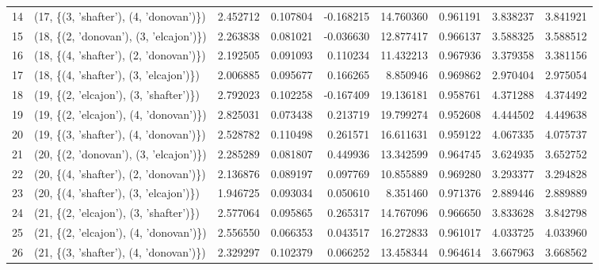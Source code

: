 \begin{tabular}{llrrrrrrr}
14 &  (17, \{(3, 'shafter'), (4, 'donovan')\}) &  2.452712 &  0.107804 & -0.168215 &  14.760360 &  0.961191 &  3.838237 &  3.841921 \\
15 &  (18, \{(2, 'donovan'), (3, 'elcajon')\}) &  2.263838 &  0.081021 & -0.036630 &  12.877417 &  0.966137 &  3.588325 &  3.588512 \\
16 &  (18, \{(4, 'shafter'), (2, 'donovan')\}) &  2.192505 &  0.091093 &  0.110234 &  11.432213 &  0.967936 &  3.379358 &  3.381156 \\
17 &  (18, \{(4, 'shafter'), (3, 'elcajon')\}) &  2.006885 &  0.095677 &  0.166265 &   8.850946 &  0.969862 &  2.970404 &  2.975054 \\
18 &  (19, \{(2, 'elcajon'), (3, 'shafter')\}) &  2.792023 &  0.102258 & -0.167409 &  19.136181 &  0.958761 &  4.371288 &  4.374492 \\
19 &  (19, \{(2, 'elcajon'), (4, 'donovan')\}) &  2.825031 &  0.073438 &  0.213719 &  19.799274 &  0.952608 &  4.444502 &  4.449638 \\
20 &  (19, \{(3, 'shafter'), (4, 'donovan')\}) &  2.528782 &  0.110498 &  0.261571 &  16.611631 &  0.959122 &  4.067335 &  4.075737 \\
21 &  (20, \{(2, 'donovan'), (3, 'elcajon')\}) &  2.285289 &  0.081807 &  0.449936 &  13.342599 &  0.964745 &  3.624935 &  3.652752 \\
22 &  (20, \{(4, 'shafter'), (2, 'donovan')\}) &  2.136876 &  0.089197 &  0.097769 &  10.855889 &  0.969280 &  3.293377 &  3.294828 \\
23 &  (20, \{(4, 'shafter'), (3, 'elcajon')\}) &  1.946725 &  0.093034 &  0.050610 &   8.351460 &  0.971376 &  2.889446 &  2.889889 \\
24 &  (21, \{(2, 'elcajon'), (3, 'shafter')\}) &  2.577064 &  0.095865 &  0.265317 &  14.767096 &  0.966650 &  3.833628 &  3.842798 \\
25 &  (21, \{(2, 'elcajon'), (4, 'donovan')\}) &  2.556550 &  0.066353 &  0.043517 &  16.272833 &  0.961017 &  4.033725 &  4.033960 \\
26 &  (21, \{(3, 'shafter'), (4, 'donovan')\}) &  2.329297 &  0.102379 &  0.066252 &  13.458344 &  0.964614 &  3.667963 &  3.668562 \\
\bottomrule
\end{tabular}
